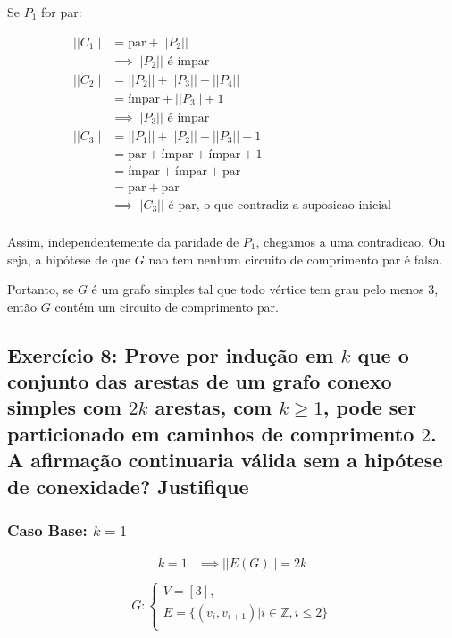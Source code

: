\documentclass{article}
\begin{document}
Se $P_1$ for par:

\begin{align}
	||C_1|| &= \text{par} + ||P_2|| \\
	&\implies ||P_2|| \text{  é ímpar} \\
	||C_2|| &= ||P_2|| + ||P_3|| + ||P_4|| \\
	&= \text{ímpar} + ||P_3||  + 1 \\
	&\implies ||P_3|| \text{   é ímpar} \\
	||C_3|| &= ||P_1|| + ||P_2|| + ||P_3||  +1 \\  
	&= \text{par} + \text{ímpar} + \text{ímpar}  +1 \\  
	&= \text{ímpar} + \text{ímpar} + \text{par}  \\  
	&= \text{par} + \text{par}  \\  
	&\implies 	||C_3|| \text{   é par, o que contradiz a suposicao inicial} \\  
\end{align}

Assim, independentemente da paridade de $P_1$, chegamos a uma contradicao. Ou seja, a hipótese de que $G$ nao tem nenhum circuito de comprimento par é falsa.

Portanto, se $G$ é um grafo simples tal que todo vértice tem grau pelo menos $3$, então $G$ contém um circuito de comprimento par.


\clearpage

 \subsection{Exercício 8: Prove por indução em $k$ que o conjunto das arestas de um grafo conexo simples com $2k$ arestas, com $k \geq 1$, pode ser particionado em caminhos de comprimento $2$. A afirmação continuaria válida sem a hipótese de conexidade? Justifique}


 \subsubsection{Caso Base: $k = 1$}
 
 \begin{align}
 	k = 1 &\implies ||E(G)|| = 2k \\
 \end{align}
\begin{align}
	G : 
	\begin{cases} 
		V = [3], \\
	    E = \{ (v_i, v_{i+1}) | i \in \mathbb{Z}, i \leq 2\} \\
	\end{cases}
\end{align}
\end{document}
